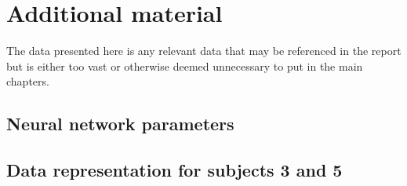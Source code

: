 

\chapter{Additional material}
\label{sec:appendix}
The data presented here is any relevant data that may be referenced in the report but is either too vast or otherwise deemed unnecessary to put in the main chapters.

\section{Neural network parameters}
\label{sec:A-nn-parameters}



\section{Data representation for subjects 3 and 5}
\label{sec:A-data-representation-4-subjects35}

